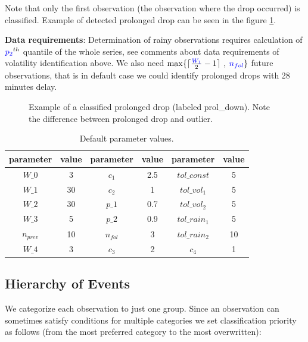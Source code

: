 \documentclass[12pt,a4paper]{article}
\begin{document}
Note that only the first observation (the observation where the drop occurred) is classified. Example of detected prolonged drop can be seen in the figure \ref{prol_drops}.

\textbf{Data requirements}: Determination of rainy observations requires calculation of $\textcolor{blue}{p_2}^{th}$ quantile of the whole series, see comments about data requirements of volatility identification above. We also need $\max\{\lceil \frac{\textcolor{blue}{W_1}}{2}-1 \rceil$ , $\textcolor{blue}{n_{fol}}\}$ future observations, that is in default case we could identify prolonged drops with 28 minutes delay.


\begin{figure}[ht]
  \noindent{}
  \caption{Example of a classified prolonged drop (labeled prol\_down). Note the difference between prolonged drop and outlier.}
    \label{prol_drops}
\end{figure}




\begin{table}[h!]
    \centering
\begin{tabular}{|cc|cc|cc|}
    \hline
    parameter & value & parameter & value & parameter & value \\
    \hline
    $W\_0$& 3 & $c_1$ & 2.5 & $tol\_const$& 5  \\
    $W\_1$& 30 & $c_2$ & 1 & $tol\_vol_1$ & 5 \\
    $W\_2$ & 30 & $p\_1$ & 0.7 & $tol\_vol_2$ & 5 \\
    $W\_3$ & 5 & $p\_2$ & 0.9 & $tol\_rain_1$ & 5 \\
    $n_{prev}$ & 10 & $n_{fol}$ & 3 & $tol\_rain_2$ & 10 \\
    $W\_4$ & 3 &  $c_3$ & 2 &  $c_4$ & 1\\
    \hline
\end{tabular}
\caption{Default parameter values.}
    \label{tab:default_vals}
\end{table}


\newpage
\subsection{Hierarchy of Events}

We categorize each observation to just one group. Since an observation can sometimes satisfy conditions for multiple categories we set classification priority as follows (from the most preferred category to the most overwritten):
\end{document}
